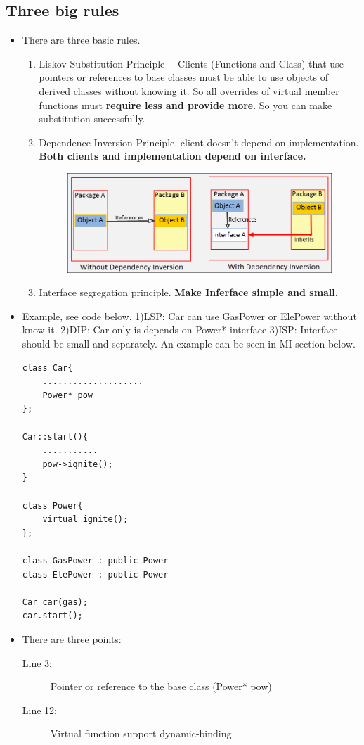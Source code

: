 \documentclass[a4paper,11pt,twoside]{book}
\begin{document}
\subsection{Three big rules}
\begin{itemize}
	\item There are three basic rules.
\begin{enumerate}
	\item Liskov Substitution Principle----Clients (Functions and Class) that use pointers or references to base classes must be able to use objects of derived classes without knowing it.  So all overrides of virtual member functions must \textbf{require less and provide more}. So you can make substitution successfully.
	
	\item Dependence Inversion Principle. client doesn't depend on implementation. \textbf{Both clients and implementation depend on interface.}
	\begin{figure}[h]
		\centering
		\includegraphics[width=0.7\linewidth]{pics/DIP.png}
		\caption{}
		\label{fig:dip}
	\end{figure}
	
	
	\item Interface segregation principle. \textbf{Make Inferface simple and small.}
\end{enumerate}

\item Example, see code below.  1)LSP: Car can use  GasPower or ElePower without know it. 2)DIP: Car only is depends on Power* interface 3)ISP: Interface should be small and separately. An example can be seen in MI section below.

\begin{lstlisting}
class Car{
	....................
	Power* pow
};

Car::start(){
	...........
	pow->ignite();
}

class Power{
	virtual ignite();
};

class GasPower : public Power
class ElePower : public Power

Car car(gas);
car.start();
\end{lstlisting}
\item There are three points:
\begin{description}
	\item[Line 3:] Pointer or reference to the base class (Power* pow)
	\item[Line 12:] Virtual function support dynamic-binding
\end{description}

\end{itemize}
\end{document}
